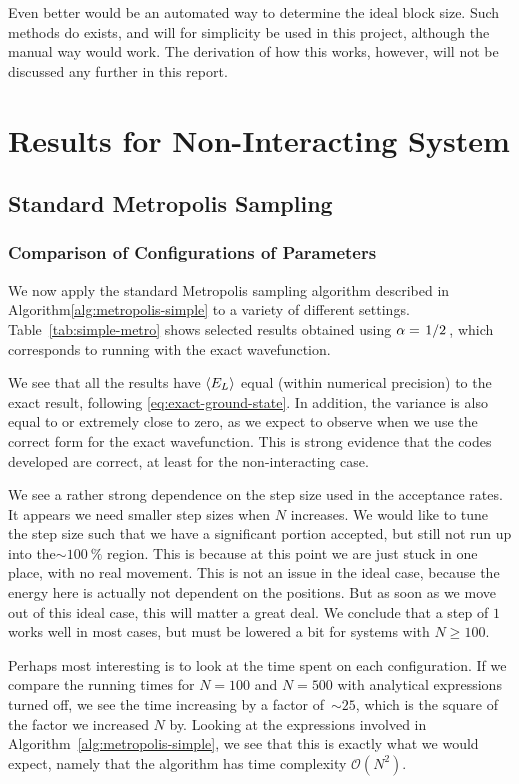 \documentclass[a4paper, 11pt]{article}
\begin{document}
\begin{multicols}{2}
Even better would be an automated way to determine the ideal block size. Such
methods do exists, and will for simplicity be used in this project, although the
manual way would work. The derivation of how this
works, however, will not be discussed any further in this report.


\section{Results for Non-Interacting System}

\subsection{Standard Metropolis Sampling}

\subsubsection{Comparison of Configurations of Parameters}

We now apply the standard Metropolis sampling algorithm described in 
Algorithm\ref{alg:metropolis-simple} to a variety of different settings.
Table~\ref{tab:simple-metro} shows selected results obtained using
$\alpha=\flatfrac{1}{2}$, which corresponds to running with the exact
wavefunction. 

We see that all the results have $\expval{E_L}$
equal (within numerical precision) to the exact result, following
\eqref{eq:exact-ground-state}. In addition, the variance is also equal to
or extremely close to zero, as we expect to observe when we use the correct form
for the exact wavefunction. This is strong evidence that the codes developed are
correct, at least for the non-interacting case.

We see a rather strong dependence on the step size used in the acceptance rates.
It appears we need smaller step sizes when $N$ increases. We would like to tune 
the step size such that we have a significant portion accepted, but still not
run up into the$\sim \SI{100}{\percent}$ region. This is because at this point
we are just stuck in one place, with no real movement. This is not an issue in
the ideal case, because the energy here is actually not dependent on the
positions. But as soon as we move out of this ideal case, this will matter a
great deal. We conclude that a step of $1$ works well in most cases, but must be
lowered a bit for systems with $N \geq 100$.

Perhaps most interesting is to look at the time spent on each configuration. If
we compare the running times for $N=100$ and $N=500$ with analytical expressions
turned off, we see the time increasing by a factor of~$\sim 25$, which is the
square of the factor we increased $N$ by. Looking at the expressions involved in
Algorithm~\ref{alg:metropolis-simple}, we see that this is exactly what we would
expect, namely that the algorithm has time complexity $\mathcal{O}(N^2)$.


\end{multicols}
\end{document}

